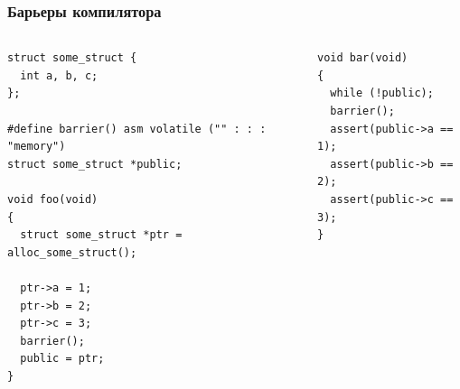 \begin{frame}[fragile]
\frametitle{Барьеры компилятора}

\begin{columns}[T]
  \begin{column}{.45\linewidth}
    \begin{lstlisting}
struct some_struct {
  int a, b, c;
};

#define barrier() asm volatile ("" : : : "memory")
struct some_struct *public;

void foo(void)
{
  struct some_struct *ptr = alloc_some_struct();

  ptr->a = 1;
  ptr->b = 2;
  ptr->c = 3;
  barrier();
  public = ptr;
}
    \end{lstlisting}
  \end{column}
  \begin{column}{.45\linewidth}
    \begin{lstlisting}
void bar(void)
{
  while (!public);
  barrier();
  assert(public->a == 1);
  assert(public->b == 2);
  assert(public->c == 3);
}
    \end{lstlisting}
  \end{column}
\end{columns}
\end{frame}

